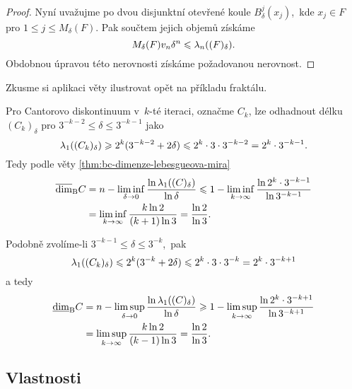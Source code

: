 \begin{proof}
    Nyní uvažujme po dvou disjunktní otevřené koule $B_\delta^j(x_j)$,~kde $x_j\in F$ pro $1\leqslant j\leqslant M_\delta(F)$. Pak součtem jejich objemů získáme
    \[M_\delta(F)v_n\delta^n\leqslant\lambda_n((F)_\delta).\]
    Obdobnou úpravou této nerovnosti získáme požadovanou nerovnost.
\end{proof}
Zkusme si aplikaci věty ilustrovat opět na příkladu fraktálu.
\begin{example}
    Pro Cantorovo diskontinuum v~$k$-té iteraci, označme $C_k$, lze odhadnout délku $(C_k)_\delta$ pro $3^{-k-2}\leqslant\delta\leqslant 3^{-k-1}$ jako
    \[\lambda_1((C_k)_\delta)\geqslant 2^k(3^{-k-2}+2\delta)\leqslant2^k\cdot 3\cdot 3^{-k-2}=2^k\cdot 3^{-k-1}.\]
    Tedy podle věty \ref{thm:bc-dimenze-lebesgueova-mira}
    \begin{align*}
        \overline{\dim}_\textup{B}{C}&=n-\liminf_{\delta\to 0}\dfrac{\ln{\ensuremath{\lambda_1}((C)_\delta)}}{\ln{\delta}}\leqslant1-\liminf_{k\to\infty}\dfrac{\ln{2^{k}\cdot 3^{-k-1}}}{\ln{3^{-k-1}}}\\
        &=\liminf_{k\to\infty}\dfrac{k\ln{2}}{(k+1)\ln{3}}=\dfrac{\ln{2}}{\ln{3}}.
    \end{align*}

    Podobně zvolíme-li $3^{-k-1}\leqslant\delta\leqslant 3^{-k}$,~pak
    \[\lambda_1((C_k)_\delta)\leqslant 2^k(3^{-k}+2\delta)\leqslant2^k\cdot 3\cdot 3^{-k}=2^k\cdot 3^{-k+1}\]
    a tedy
    \begin{align*}
        \underline{\dim}_\textup{B}{C}&=n-\limsup_{\delta\to 0}\dfrac{\ln{\ensuremath{\lambda_1}((C)_\delta)}}{\ln{\delta}}\geqslant 1-\limsup_{k\to\infty}\dfrac{\ln{2^{k}\cdot 3^{-k+1}}}{\ln{3^{-k+1}}}\\
        &=\limsup_{k\to\infty}\dfrac{k\ln{2}}{(k-1)\ln{3}}=\dfrac{\ln{2}}{\ln{3}}.
    \end{align*}
\end{example}

\subsection{Vlastnosti}\label{subsec:vlastnosti-bc-dimenze}

